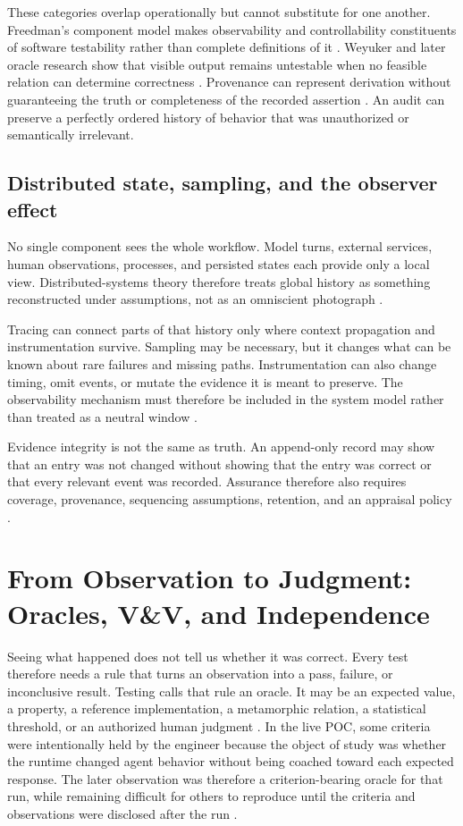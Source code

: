 \documentclass[10pt,a4paper]{article}
\begin{document}
These categories overlap operationally but cannot substitute for one another. Freedman's component model makes observability and controllability constituents of software testability rather than complete definitions of it \cite{freedman1991}. Weyuker and later oracle research show that visible output remains untestable when no feasible relation can determine correctness \cite{weyuker1982,barr2015}. Provenance can represent derivation without guaranteeing the truth or completeness of the recorded assertion \cite{provdm2013}. An audit can preserve a perfectly ordered history of behavior that was unauthorized or semantically irrelevant.

\subsection{Distributed state, sampling, and the observer effect}

No single component sees the whole workflow. Model turns, external services, human observations, processes, and persisted states each provide only a local view. Distributed-systems theory therefore treats global history as something reconstructed under assumptions, not as an omniscient photograph \cite{lamport1978,chandy1985}.

Tracing can connect parts of that history only where context propagation and instrumentation survive. Sampling may be necessary, but it changes what can be known about rare failures and missing paths. Instrumentation can also change timing, omit events, or mutate the evidence it is meant to preserve. The observability mechanism must therefore be included in the system model rather than treated as a neutral window \cite{gait1986,dapper2010,otel,w3ctrace}.

Evidence integrity is not the same as truth. An append-only record may show that an entry was not changed without showing that the entry was correct or that every relevant event was recorded. Assurance therefore also requires coverage, provenance, sequencing assumptions, retention, and an appraisal policy \cite{nist80053,rfc9162}.

\section{From Observation to Judgment: Oracles, V\&V, and Independence}

Seeing what happened does not tell us whether it was correct. Every test therefore needs a rule that turns an observation into a pass, failure, or inconclusive result. Testing calls that rule an oracle. It may be an expected value, a property, a reference implementation, a metamorphic relation, a statistical threshold, or an authorized human judgment \cite{barr2015}. In the live POC, some criteria were intentionally held by the engineer because the object of study was whether the runtime changed agent behavior without being coached toward each expected response. The later observation was therefore a criterion-bearing oracle for that run, while remaining difficult for others to reproduce until the criteria and observations were disclosed after the run \cite{sessionrecord,caseevidence}.
\end{document}
